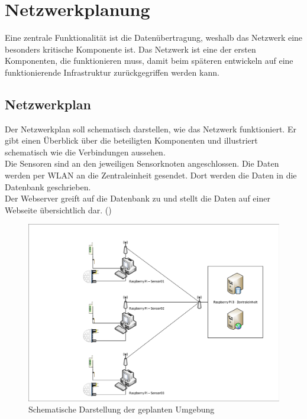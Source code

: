 \section{Netzwerkplanung}
Eine zentrale Funktionalität ist die Datenübertragung, weshalb das Netzwerk eine besonders kritische Komponente ist. Das Netzwerk ist eine der ersten Komponenten, die funktionieren muss, damit beim späteren entwickeln auf eine funktionierende Infrastruktur zurückgegriffen werden kann.

\subsection{Netzwerkplan}
Der Netzwerkplan soll schematisch darstellen, wie das Netzwerk funktioniert. Er gibt einen Überblick über die beteiligten Komponenten und illustriert schematisch wie die Verbindungen aussehen.\\
Die Sensoren sind an den jeweiligen Sensorknoten angeschlossen. Die Daten werden per WLAN an die Zentraleinheit gesendet. Dort werden die Daten in die Datenbank
geschrieben.\\
Der Webserver greift auf die Datenbank zu und stellt die Daten auf einer Webseite
übersichtlich dar. ()
\begin{figure} [htb]
\begin{centering}
\includegraphics[scale=0.4]{Bilder/Kapitel3/Netzplan.pdf}
\caption[Schematische Darstellung der geplanten Umgebung]{Schematische
Darstellung der geplanten Umgebung}
\label{Darstellung_Umgebung}
\end{centering}
\end{figure} 

